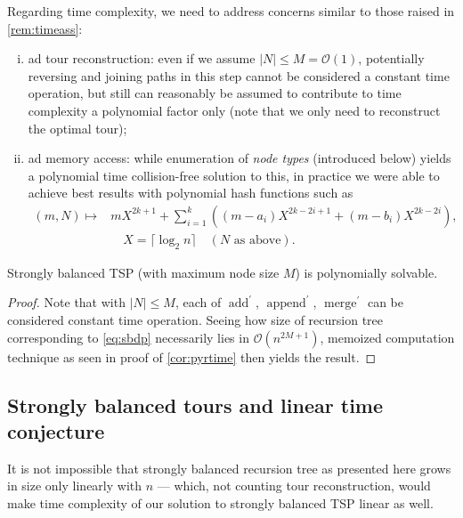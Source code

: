 \documentclass[titlepage,twoside,index=totoc,bibliography=totoc]{scrartcl}
\numberwithin{equation}{section}
\numberwithin{figure}{section}
\numberwithin{table}{section}
\let\defstyle\itshape
\begin{document}
Regarding time complexity, we need to address concerns similar to
those raised in
\cref{rem:timeass}:
\begin{enumerate}[(i)]
  \item
    ad tour reconstruction:
    even if we assume $\left|N\right| \leq M = \mathcal{O}\left(1\right)$,
    potentially reversing and joining paths
    in this step cannot be considered a constant time operation,
    but still can reasonably be assumed to contribute to time complexity
    a polynomial factor only (note that we only need to reconstruct the optimal tour);
  \item
    ad memory access:
    while enumeration of {\defstyle node types} (introduced below) yields
    a polynomial time collision-free solution to this,
    in practice we were able to achieve best results with polynomial hash functions such as
    \begin{align*}
      \left(m,N\right) \mapsto & mX^{2k+1}
        + \sum_{i=1}^k\left((m-a_i)X^{2k-2i+1} + (m-b_i)X^{2k-2i}\right),
      \\
      & \quad X = \lceil\log_2 n\rceil \quad (N \text{\ as above}).
    \end{align*}
\end{enumerate}

\begin{corollary}
\label{cor:sbtime}
  Strongly balanced TSP (with maximum node size $M$) is polynomially solvable.
\end{corollary}
\begin{proof}
  Note that with $\left|N\right| \leq M$, each of
  $\operatorname{add}^\prime$, $\operatorname{append}^\prime$,
  $\operatorname{merge}^\prime$ can be considered constant time
  operation.
  Seeing how size of recursion tree corresponding to \cref{eq:sbdp}
  necessarily lies in $\mathcal{O}\left(n^{2M+1}\right)$,
  memoized computation technique as seen in proof of \cref{cor:pyrtime}
  then yields the result.
\end{proof}

\subsection{Strongly balanced tours and linear time conjecture}

It is not impossible that strongly balanced recursion tree as presented
here grows in size only linearly with $n$ --- which, not counting tour
reconstruction, would make time complexity of our solution to strongly
balanced TSP linear as well.
\end{document}
